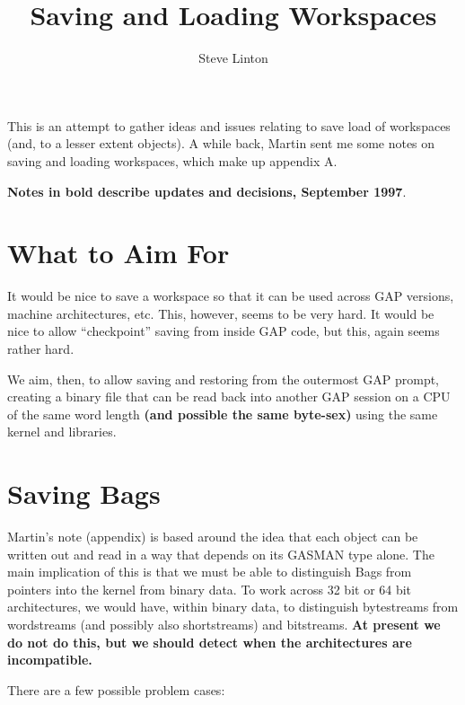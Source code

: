 \documentclass[11pt]{article}
\title{Saving and Loading Workspaces}
\author{Steve Linton}
\begin{document}
\maketitle

This is an attempt to gather ideas and issues relating to save load of
workspaces (and, to a lesser extent objects). A while back, Martin
sent me some notes on saving and loading workspaces, which make up
appendix A.

\textbf{Notes in bold describe updates and decisions, September 1997}.

\section{What to Aim For}

It would be nice to save a workspace so that it can be used across GAP
versions, machine architectures, etc. This, however, seems to be very
hard. It would be nice to allow ``checkpoint'' saving from inside GAP
code, but this, again seems rather hard.

We aim, then, to allow saving and restoring from the outermost GAP
prompt, creating a binary file that can be read back into another GAP
session on a CPU of the same word length \textbf{(and possible the
same byte-sex)} using the same kernel and libraries. 


\section{Saving Bags}

Martin's note (appendix) is based around the idea that each object can
be written out and read in a way that depends on its GASMAN type
alone. The main implication of this is that we must be able to
distinguish Bags from pointers into the kernel from binary data. To
work across 32 bit or 64 bit architectures, we would have, within binary
data, to distinguish bytestreams from wordstreams (and possibly also
shortstreams) and bitstreams. \textbf{At present we do not do this,
but we should detect when the architectures are incompatible.} 

There are a few possible problem cases:
\end{document}
